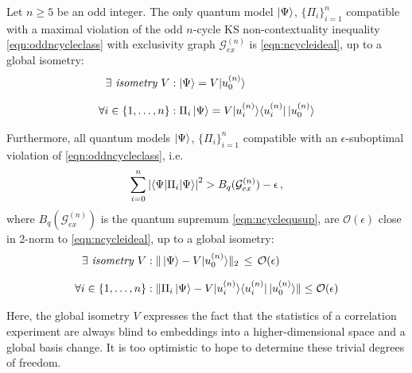 \begin{theorem}
\label{thm:contselftesting}\hfill\break
Let $n\geq5$ be an odd integer. The only quantum model $\ket{\Psi}$, $\{\Pi_i\}_{i=1}^n$ compatible with a maximal violation of the odd $n$-cycle KS non-contextuality inequality \ref{eqn:oddncycleclass} with exclusivity graph $\mathcal{G}_{ex}^{(n)}$ is \ref{eqn:ncycleideal}, up to a global isometry:
\begin{align*}
    \exists \emph{ isometry } V & : \ket{\Psi} = V \vert u_0^{(n)}\rangle \\[0.7em]
    \forall i\in\{1,\dots,n\} & : \Pi_i \ket{\Psi} = V \vert u_i^{(n)} \rangle \langle u_i^{(n)} \vert \thinspace \vert u_0^{(n)} \rangle
\end{align*}

Furthermore, all quantum models $\ket{\Psi}$, $\{\Pi_i\}_{i=1}^n$ compatible with an $\epsilon$-suboptimal violation of \ref{eqn:oddncycleclass}, i.e.\
\begin{equation*}
    \sum_{i=0}^n \abs{\langle \Psi \vert \Pi_i \vert \Psi \rangle}^2> B_q(\mathcal{G}_{ex}^{(n)})-\epsilon\thinspace ,
\end{equation*}where $B_q(\mathcal{G}_{ex}^{(n)})$ is the quantum supremum \ref{eqn:ncyclequsup}, are $\mathcal{O}(\epsilon)$ close in 2-norm to \ref{eqn:ncycleideal}, up to a global isometry:
\begin{align*}
    \exists \emph{ isometry } V & : \| \ket{\Psi} - V \vert u_0^{(n)}\rangle \|_2 \thinspace\leq\thinspace \mathcal{O}(\epsilon)\\[0.7em]
    \forall i\in\{1,\dots,n\} & : \| \Pi_i \ket{\Psi} - V \vert u_i^{(n)} \rangle \langle u_i^{(n)} \vert \thinspace \vert u_0^{(n)} \rangle \| \leq \mathcal{O}(\epsilon)
\end{align*}
\end{theorem}

Here, the global isometry $V$ expresses the fact that the statistics of a correlation experiment are always blind to embeddings into a higher-dimensional space and a global basis change. It is too optimistic to hope to determine these trivial degrees of freedom. 

